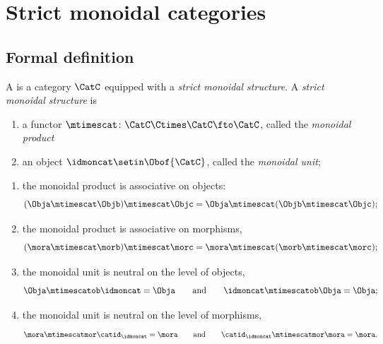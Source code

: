 
\section{Strict monoidal categories}\label{sec:stric-monoidal-cats}

    
    
    
\subsection{Formal definition}

\begin{ctdefinition}
    \label{def:strict-monoidal-cat}
    A  is a category $\CatC$ equipped with a \emph{strict monoidal structure}. A \emph{strict monoidal structure} is

    \constit

    \begin{enumerate}
        \item a functor $\mtimescat \colon \CatC \Ctimes \CatC \fto \CatC$, called the \emph{monoidal product}
        \item an object $\idmoncat \setin \Obof{\CatC}$, called the \emph{monoidal unit};
    \end{enumerate}

    \condit

    \begin{enumerate}
    \item the monoidal product is associative on objects: 
    \begin{equation}
     (\Obja \mtimescat \Objb) \mtimescat \Objc = \Obja \mtimescat (\Objb \mtimescat \Objc);
    \end{equation}

    \item the monoidal product is associative on morphisms,
    \begin{equation}
     (\mora \mtimescat \morb) \mtimescat \morc = \mora \mtimescat (\morb \mtimescat \morc);
    \end{equation}
    
        \item  the monoidal unit is neutral on the level of objects,
              \begin{equation}\label{eq:strict-mon-stacking-cat-cond1}
                  \Obja \mtimescatob \idmoncat = \Obja \qquad \text{and} \qquad \idmoncat \mtimescatob \Obja = \Obja;
              \end{equation}
        \item the monoidal unit is neutral on the level of morphisms,
              \begin{equation}\label{eq:strict-mon-stacking-cat-cond2}
                  \mora \mtimescatmor \catid_\idmoncat = \mora \qquad \text{and} \qquad \catid_\idmoncat \mtimescatmor  \mora = \mora.
              \end{equation}
    \end{enumerate}
\end{ctdefinition}

